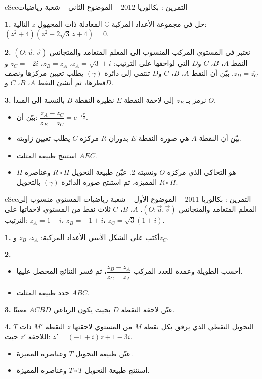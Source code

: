 \documentclass[12pt,a4paper]{article}
\newenvironment{BOX}[2]{\begin{otherlanguage}{english}\begin{arbox}{#1}{#2}}{\end{arbox}\end{otherlanguage}}
\newcounter{exo}
\newenvironment{tamrin}[1]{\stepcounter{exo}\begin{BOX}{cSec}{التمرين \theexo: #1}}{\end{BOX}}
\newenvironment{sq}{\begin{itemize}[leftmargin=2.4em,itemsep=3pt]}{\end{itemize}}
\newcommand{\qa}{\item[(أ)]}\newcommand{\qb}{\item[(ب)]}\newcommand{\qc}{\item[(جـ)]}\newcommand{\qd}{\item[(د)]}\newcommand{\qe}{\item[(هـ)]}
\newcommand{\QQ}[1]{\par\smallskip\textbf{#1.} }
\begin{document}
\begin{tamrin}{بكالوريا 2012 -- الموضوع الثاني -- شعبة رياضيات}
\QQ{1} حل في مجموعة الأعداد المركبة $\mathbb C$ المعادلة ذات المجهول $z$ التالية: $(z^2+4)(z^2-2\sqrt3\,z+4)=0$.
\QQ{2} نعتبر في المستوي المركب المنسوب إلى المعلم المتعامد والمتجانس $(O;\vec u,\vec v)$ النقط $A$، $B$، $C$ و$D$ التي لواحقها على الترتيب:
$z_A=\sqrt3+i$، $z_B=\overline{z_A}$، $z_C=-2i$ و$z_D=\overline{z_C}$.
بيّن أن النقط $A$، $B$، $C$ و$D$ تنتمي إلى دائرة $(\gamma)$ يطلب تعيين مركزها ونصف قطرها، ثم أنشئ النقط $A$، $B$، $C$ و$D$.
\QQ{3} نرمز بـ $z_E$ إلى لاحقة النقطة $E$ نظيرة النقطة $B$ بالنسبة إلى المبدأ $O$.
\begin{sq}
\qa بيّن أن: $\dfrac{z_A-z_C}{z_E-z_C}=e^{-i\frac{\pi}{3}}$.
\qb بيّن أن النقطة $A$ هي صورة النقطة $E$ بدوران $R$ مركزه $C$ يطلب تعيين زاويته.
\qc استنتج طبيعة المثلث $AEC$.
\qd $H$ هو التحاكي الذي مركزه $O$ ونسبته $2$. عيّن طبيعة التحويل $R\circ H$ وعناصره المميزة، ثم استنتج صورة الدائرة $(\gamma)$ بالتحويل $R\circ H$.
\end{sq}
\end{tamrin}

\begin{tamrin}{بكالوريا 2011 -- الموضوع الأول -- شعبة رياضيات}
المستوي منسوب إلى المعلم المتعامد والمتجانس $(O;\vec u,\vec v)$. $A$، $B$، $C$ ثلاث نقط من المستوي لاحقاتها على الترتيب: $z_A=1-i$، $z_B=-1+i$، $z_C=\sqrt3(1+i)$.
\QQ{1} أكتب على الشكل الأسي الأعداد المركبة: $z_A$، $z_B$ و$z_C$.
\QQ{2}
\begin{sq}
\qa أحسب الطويلة وعمدة للعدد المركب $\dfrac{z_B-z_A}{z_C-z_A}$، ثم فسر النتائج المحصل عليها.
\qb حدد طبيعة المثلث $ABC$.
\end{sq}
\QQ{3} عيّن لاحقة النقطة $D$ بحيث يكون الرباعي $ACBD$ معينًا.
\QQ{4} $T$ التحويل النقطي الذي يرفق بكل نقطة $M$ من المستوي لاحقتها $z$ النقطة $M'$ ذات اللاحقة $z'$ حيث: $z'=(-1+i)z+1-3i$.
\begin{sq}
\qa عيّن طبيعة التحويل $T$ وعناصره المميزة.
\qb استنتج طبيعة التحويل $T\circ T$ وعناصره المميزة.
\end{sq}
\end{tamrin}
\end{document}
